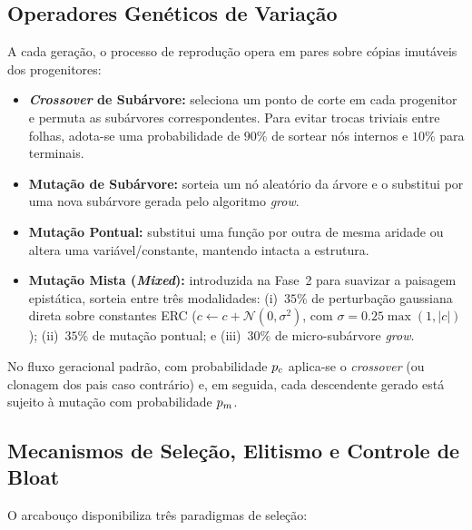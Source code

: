 \subsection{Operadores Genéticos de Variação}
\label{sec:impl_operadores}

A cada geração, o processo de reprodução opera em pares sobre cópias imutáveis
dos progenitores:
\begin{itemize}
  \item \textbf{\emph{Crossover} de Subárvore:} seleciona um ponto de corte em
        cada progenitor e permuta as subárvores correspondentes. Para evitar
        trocas triviais entre folhas, adota-se uma probabilidade de $90\%$ de
        sortear nós internos e $10\%$ para terminais.
  \item \textbf{Mutação de Subárvore:} sorteia um nó aleatório da árvore e o
        substitui por uma nova subárvore gerada pelo algoritmo \emph{grow}.
  \item \textbf{Mutação Pontual:} substitui uma função por outra de mesma
        aridade ou altera uma variável/constante, mantendo intacta a estrutura.
  \item \textbf{Mutação Mista (\emph{Mixed}):} introduzida na Fase~2 para
        suavizar a paisagem epistática, sorteia entre três modalidades:
        (i)~$35\%$ de perturbação gaussiana direta sobre constantes ERC
        ($c \leftarrow c + \mathcal{N}(0, \sigma^2)$, com $\sigma = 0.25\max(1, |c|)$);
        (ii)~$35\%$ de mutação pontual; e (iii)~$30\%$ de micro-subárvore
        \emph{grow}.
\end{itemize}
No fluxo geracional padrão, com probabilidade $p_c$ aplica-se o \emph{crossover}
(ou clonagem dos pais caso contrário) e, em seguida, cada descendente gerado
está sujeito à mutação com probabilidade $p_m$.

\subsection{Mecanismos de Seleção, Elitismo e Controle de Bloat}
\label{sec:impl_selecao}

O arcabouço disponibiliza três paradigmas de seleção:

